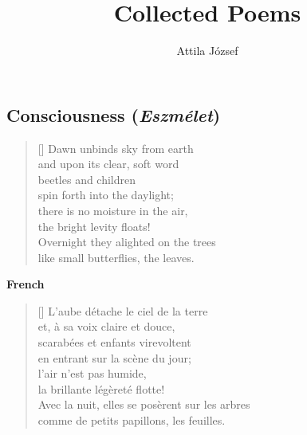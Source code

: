 \documentclass[a4paper,12pt,twoside,final]{book}
\title{Collected Poems}
\author{Attila József}
\begin{document}
\maketitle

\chapter{}
\section{Consciousness (\emph{Eszmélet})}




\settowidth{\versewidth}{Overnight they alighted on the trees}

\begin{verse}[\versewidth]
  Dawn unbinds sky from earth \\
  and upon its clear, soft word \\
  beetles and children \\
  spin forth into the daylight; \\
  there is no moisture in the air, \\
  the bright levity floats! \\
  Overnight they alighted on the trees \\
  like small butterflies, the leaves. \\
\end{verse}

\noindent \textbf{French}


\settowidth{\versewidth}{Avec la nuit, elles se posèrent sur les arbres}

\begin{verse}[\versewidth]
  L'aube détache le ciel de la terre \\
  et, à sa voix claire et douce, \\
  scarabées et enfants virevoltent \\
  en entrant sur la scène du jour; \\
  l'air n'est pas humide, \\
  la brillante légèreté flotte! \\
  Avec la nuit, elles se posèrent sur les arbres \\
  comme de petits papillons, les feuilles. \\
\end{verse}
\end{document}
